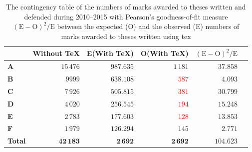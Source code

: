 \documentclass[12pt,twoside,color,table]%
  {fithesis3/fithesis3/fithesis3} %
\begin{document}
  \begin{table}
    \caption{The contingency table of the numbers of marks awarded
      to theses written and defended during 2010--2015 with
      Pearson's goodness-of-fit measure
      $(\text{E}-\text{O})^2/\text{E}$ between the expected (O)
      and the observed (E) numbers of marks awarded to theses
      written using \gls{tex}}
    \begin{tabularx}{\textwidth}{Xrrrrr}
      &\textbf{Without \TeX}&E(\textbf{With \TeX})
      &O(\textbf{With \TeX})&$(\text{E}-\text{O})^2/\text{E}$
      \\ \toprule
      \textbf{\parbox[t]{1em}{\centering A}} 
        &$15\,476$&$987.635$&\textcolor{OliveGreen}{$1\,181$}&
        $37.858$\\
      \textbf{\parbox[t]{1em}{\centering B}}
        &$9999$&$638.108$&\textcolor{red}{$587$}&$4.093$\\
      \textbf{\parbox[t]{1em}{\centering C}}
        &$7\,926$&$505.815$&\textcolor{red}{$381$}&$30.799$\\
      \textbf{\parbox[t]{1em}{\centering D}}
        &$4\,020$&$256.545$&\textcolor{red}{$194$}&$15.248$\\
      \textbf{\parbox[t]{1em}{\centering E}}
        &$2\,783$&$177.603$&\textcolor{red}{$128$}&$13.853$\\
      \textbf{\parbox[t]{1em}{\centering F}}
        &$1\,979$&$126.294$&\textcolor{OliveGreen}{$145$}&
        $2.771$\\
      \bottomrule
      \textbf{Total} &$\mathbf{42\,183}$&$\mathbf{2\,692}$&
        $\mathbf{2\,692}$&$\mathbf{104.623}$
    \end{tabularx}
    \label{table:statistics-contingency}
  \end{table}
\end{document}
